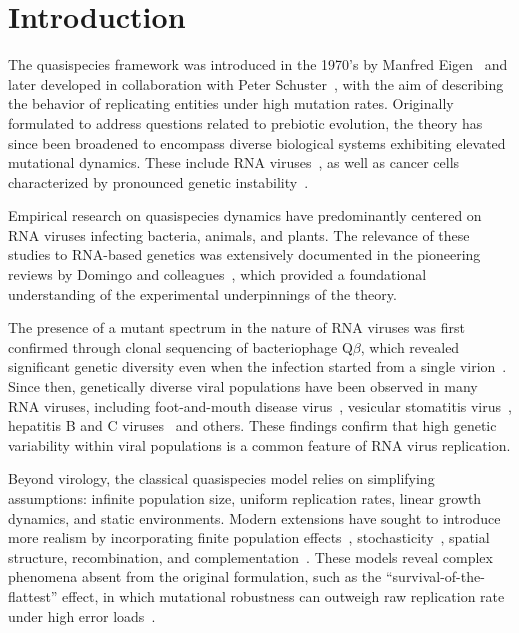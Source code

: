 \documentclass[11pt,reqno]{amsart}
\theoremstyle{definition}
\begin{document}
\section{Introduction}

The quasispecies framework was introduced in the 1970's by Manfred Eigen~\cite{Eigen1971} and later developed in collaboration with Peter Schuster~\cite{Eigen1988}, with the aim of describing the behavior of replicating entities under high mutation rates. Originally formulated to address questions related to prebiotic evolution, the theory has since been broadened to encompass diverse biological systems exhibiting elevated mutational dynamics. These include RNA viruses~\cite{Mas2004,Perales2020,Revull2021}, as well as cancer cells characterized by pronounced genetic instability~\cite{Sole2003,Sole2004,Brumera2006}.

Empirical research on quasispecies dynamics have predominantly centered on RNA viruses infecting bacteria, animals, and plants. The relevance of these studies to RNA-based genetics was extensively documented in the pioneering reviews by Domingo and colleagues~\cite{Domingo1985,Domingo1988}, which provided a foundational understanding of the experimental underpinnings of the theory.  

The presence of a mutant spectrum in the nature of RNA viruses was first confirmed through clonal sequencing of bacteriophage Q$\beta$, which revealed significant genetic diversity even when the infection started from a single virion~\cite{Domingo1978}. Since then, genetically diverse viral populations have been observed in many RNA viruses, including foot-and-mouth disease virus~\cite{Domingo1980,Sobrino1983}, vesicular stomatitis virus~\cite{Holland1979,Holland1982}, hepatitis B and C viruses~\cite{Martell1992,Davis1999,Mas2004,Perales2020} and others. These findings confirm that high genetic variability within viral populations is a common feature of RNA virus replication.

Beyond virology, the classical quasispecies model relies on simplifying assumptions: infinite population size, uniform replication rates, linear growth dynamics, and static environments. Modern extensions have sought to introduce more realism by incorporating finite population effects~\cite{Nowak1989,Sardanyes2008}, stochasticity~\cite{Sardanyes2011,Ari2016}, spatial structure, recombination, and complementation~\cite{Sardanyes2010}. These models reveal complex phenomena absent from the original formulation, such as the ``survival-of-the-flattest'' effect, in which mutational robustness can outweigh raw replication rate under high error loads~\cite{Wilke2001,Wilke2001b}.
\end{document}
